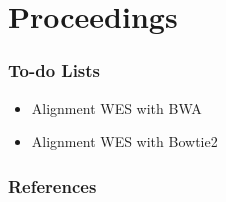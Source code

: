 \documentclass{beamer}
\begin{document}
    \section{Proceedings}
    \begin{frame}[allowframebreaks]
        \frametitle{To-do Lists}

        \begin{itemize}
            \item Alignment WES with BWA
            \item Alignment WES with Bowtie2
        \end{itemize}
    \end{frame}

    \begin{frame}[allowframebreaks]
        \frametitle{References}
        
        
    \end{frame}
\end{document}
